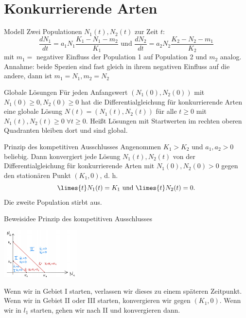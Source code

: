 \section{Konkurrierende Arten}

\begin{karte}{Modell}
    Zwei Populationen \(N_1(t), N_2(t)\) zur Zeit \(t\): 
    \[ \frac{dN_1}{dt} = a_1 N_1 \frac{K_1 - N_1 - m_2}{K_1} 
    \text{ und } \frac{dN_2}{dt} = a_2 N_2 \frac{K_2 - N_2 - m_1}{K_2} \]
    mit \(m_1 = \) negativer Einfluss der Population 1 auf Population 2 und \(m_2\) analog.\\
    Annahme: beide Spezien sind fast gleich in ihrem negativen Einfluss auf die andere, 
    dann ist \(m_1 = N_1, m_2 = N_2\)
\end{karte}

\begin{karte}{Globale Lösungen}
    Für jeden Anfangswert \((N_1(0), N_2(0))\) mit \(N_1(0) \geq 0, N_2(0) \geq 0\)
    hat die Differentialgleichung für konkurrierende Arten eine globale Lösung 
    \(N(t) = (N_1(t), N_2(t))\) für alle \(t\geq 0\) mit \(N_1(t), N_2(t) \geq 0 \;\forall t\geq 0\).
    Heißt Lösungen mit Startwerten im rechten oberen Quadranten bleiben dort und sind global.
\end{karte}

\begin{karte}{Prinzip des kompetitiven Ausschlusses}
    Angenommen \(K_1 > K_2\) und \(a_1,a_2 > 0\) beliebig. Dann konvergiert 
    jede Lösung \(N_1(t), N_2(t)\) von der Differentialgleichung für konkurrierende
    Arten mit \(N_1(0), N_2(0) > 0\) gegen den stationären Punkt \((K_1, 0)\), 
    d. h. 
    \[ \limes{t} N_1(t) = K_1 \text{ und } \limes{t} N_2(t) = 0. \]
    Die zweite Population stirbt aus.
\end{karte}

\begin{karte}{Beweisidee Prinzip des kompetitiven Ausschlusses}
    \begin{center}
        \includegraphics[width=0.3\textwidth]{img/kompetitiver-ausschluss.png}
    \end{center}
    Wenn wir in Gebiet I starten, verlassen wir dieses zu einem späteren Zeitpunkt. 
    Wenn wir in Gebiet II oder III starten, konvergieren wir gegen \((K_1, 0)\).
    Wenn wir in \(l_1\) starten, gehen wir nach II und konvergieren dann. 
\end{karte}